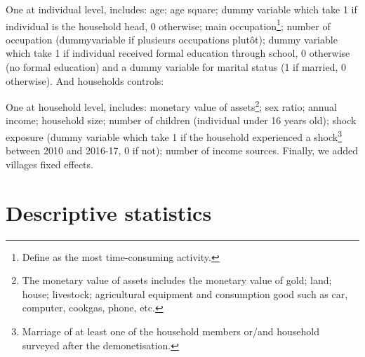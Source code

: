 \documentclass[a4paper, 11pt, onecolumn]{article}
\begin{document}
One at individual level, includes: age; age square; dummy variable which take 1 if individual is the household head, 0 otherwise; main occupation\footnote{Define as the most time-consuming activity.}; number of occupation (dummyvariable if plusieurs occupations plutôt); dummy variable which take 1 if individual received formal education through school, 0 otherwise (no formal education) and a dummy variable for marital status (1 if married, 0 otherwise). 
And households controls: 

One at household level, includes: monetary value of assets\footnote{The monetary value of assets includes the monetary value of gold; land; house; livestock; agricultural equipment and consumption good such as car, computer, cookgas, phone, etc.}; sex ratio; annual income; household size; number of children (individual under 16 years old); shock exposure (dummy variable which take 1 if the household experienced a shock\footnote{Marriage of at least one of the household members or/and household surveyed after the demonetisation.} between 2010 and 2016-17, 0 if not); number of income sources. 
Finally, we added villages fixed effects.










\newpage
\section{Descriptive statistics}
\end{document}
